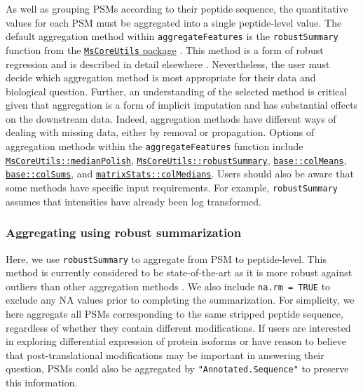\documentclass[9pt,a4paper,]{extarticle}
\begin{document}
As well as grouping PSMs according to their peptide sequence, the quantitative
values for each PSM must be aggregated into a single peptide-level value. The
default aggregation method within \texttt{aggregateFeatures} is the \texttt{robustSummary}
function from the
\href{https://bioconductor.org/packages/release/bioc/html/MsCoreUtils.html}{\texttt{MsCoreUtils} package}
\citep{Rainer2022}. This method is a form of robust regression and is described in
detail elsewhere \citep{Sticker2020}. Nevertheless, the user must decide which
aggregation method is most appropriate for their data and biological question.
Further, an understanding of the selected method is critical given that
aggregation is a form of implicit imputation and has substantial effects on the
downstream data. Indeed, aggregation methods have different ways of dealing with
missing data, either by removal or propagation. Options of aggregation methods
within the \texttt{aggregateFeatures} function include
\href{https://rdrr.io/bioc/MsCoreUtils/man/medianPolish.html}{\texttt{MsCoreUtils::medianPolish}},
\href{https://rdrr.io/bioc/MsCoreUtils/man/robustSummary.html}{\texttt{MsCoreUtils::robustSummary}},
\href{https://www.rdocumentation.org/packages/base/versions/3.6.2/topics/colSums}{\texttt{base::colMeans}},
\href{https://www.rdocumentation.org/packages/base/versions/3.6.2/topics/colSums}{\texttt{base::colSums}},
and \href{https://rdrr.io/rforge/matrixStats/man/rowMedians.html}{\texttt{matrixStats::colMedians}}.
Users should also be aware that some methods have specific input requirements.
For example, \texttt{robustSummary} assumes that intensities have already been log
transformed.

\subsubsection{Aggregating using robust summarization}\label{aggregating-using-robust-summarization}

Here, we use \texttt{robustSummary} to aggregate from PSM to peptide-level. This method
is currently considered to be state-of-the-art as it is more robust against
outliers than other aggregation methods \citep{Sticker2020, Goeminne2016}. We also
include \texttt{na.rm\ =\ TRUE} to exclude any NA values prior to completing the
summarization. For simplicity, we here aggregate all PSMs corresponding to the
same stripped peptide sequence, regardless of whether they contain different
modifications. If users are interested in exploring differential expression of
protein isoforms or have reason to believe that post-translational modifications
may be important in answering their question, PSMs could also be aggregated by
\texttt{"Annotated.Sequence"} to preserve this information.
\end{document}
